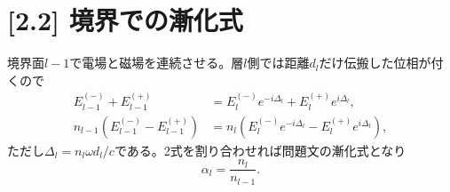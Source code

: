 \documentclass[11pt,a4paper]{article}
\begin{document}
\section*{[2.2] 境界での漸化式}
境界面$l-1$で電場と磁場を連続させる。層$l$側では距離$d_l$だけ伝搬した位相が付くので
\begin{align}
 E_{l-1}^{(-)}+E_{l-1}^{(+)}
 &=E_l^{(-)}e^{-i\Delta_l}+E_l^{(+)}e^{i\Delta_l},\\
 n_{l-1}(E_{l-1}^{(-)}-E_{l-1}^{(+)})
 &=n_l(E_l^{(-)}e^{-i\Delta_l}-E_l^{(+)}e^{i\Delta_l}),
\end{align}
ただし$\Delta_l=n_l\omega d_l/c$である。2式を割り合わせれば問題文の漸化式となり
\begin{equation}
 \boxed{\alpha_l=\frac{n_l}{n_{l-1}}}.
\end{equation}
\end{document}
